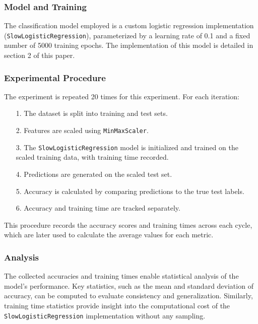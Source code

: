\documentclass{article}
\theoremstyle{plain}
\theoremstyle{definition}
\theoremstyle{remark}
\begin{document}
\subsubsection{Model and Training}

The classification model employed is a custom logistic regression implementation (\texttt{SlowLogisticRegression}), parameterized by a learning rate of 0.1 and a fixed number of 5000 training epochs. The implementation of this model is detailed in section 2 of this paper.


\subsubsection{Experimental Procedure}

The experiment is repeated 20 times for this experiment. For each iteration:

\begin{itemize}
 \item [1.] The dataset is split into training and test sets.
 \item [2.] Features are scaled using \texttt{MinMaxScaler}.
 \item [3.] The \texttt{SlowLogisticRegression} model is initialized and trained on the scaled training data, with training time recorded.
 \item [4.] Predictions are generated on the scaled test set.
 \item [5.] Accuracy is calculated by comparing predictions to the true test labels.
 \item [6.] Accuracy and training time are tracked separately.
\end{itemize}

This procedure records the accuracy scores and training times across each cycle, which are later used to calculate the average values for each metric.


\subsubsection{Analysis}

The collected accuracies and training times enable statistical analysis of the model's performance. Key statistics, such as the mean and standard deviation of accuracy, can be computed to evaluate consistency and generalization. Similarly, training time statistics provide insight into the computational cost of the \texttt{SlowLogisticRegression} implementation without any sampling.
\end{document}
